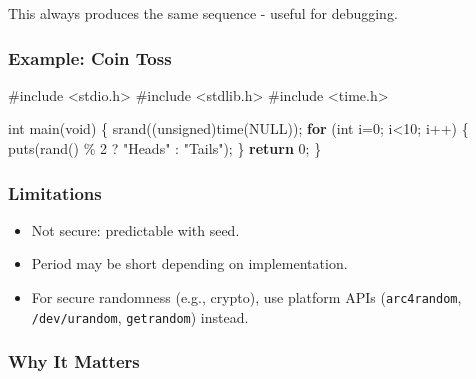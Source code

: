 \documentclass[
  letterpaper,
  DIV=11,
  numbers=noendperiod]{scrreprt}
\newenvironment{Shaded}{\begin{snugshade}}{\end{snugshade}}
\newcommand{\ControlFlowTok}[1]{\textcolor[rgb]{0.00,0.23,0.31}{\textbf{#1}}}
\newcommand{\DataTypeTok}[1]{\textcolor[rgb]{0.68,0.00,0.00}{#1}}
\newcommand{\DecValTok}[1]{\textcolor[rgb]{0.68,0.00,0.00}{#1}}
\newcommand{\ImportTok}[1]{\textcolor[rgb]{0.00,0.46,0.62}{#1}}
\newcommand{\NormalTok}[1]{\textcolor[rgb]{0.00,0.23,0.31}{#1}}
\newcommand{\OperatorTok}[1]{\textcolor[rgb]{0.37,0.37,0.37}{#1}}
\newcommand{\PreprocessorTok}[1]{\textcolor[rgb]{0.68,0.00,0.00}{#1}}
\newcommand{\StringTok}[1]{\textcolor[rgb]{0.13,0.47,0.30}{#1}}
\providecommand{\tightlist}{%
  \setlength{\itemsep}{0pt}\setlength{\parskip}{0pt}}
\begin{document}
This always produces the same sequence - useful for debugging.

\subsubsection{Example: Coin Toss}\label{example-coin-toss}

\begin{Shaded}
\begin{Highlighting}[]
\PreprocessorTok{\#include }\ImportTok{\textless{}stdio.h\textgreater{}}
\PreprocessorTok{\#include }\ImportTok{\textless{}stdlib.h\textgreater{}}
\PreprocessorTok{\#include }\ImportTok{\textless{}time.h\textgreater{}}

\DataTypeTok{int}\NormalTok{ main}\OperatorTok{(}\DataTypeTok{void}\OperatorTok{)} \OperatorTok{\{}
\NormalTok{    srand}\OperatorTok{((}\DataTypeTok{unsigned}\OperatorTok{)}\NormalTok{time}\OperatorTok{(}\NormalTok{NULL}\OperatorTok{));}
    \ControlFlowTok{for} \OperatorTok{(}\DataTypeTok{int}\NormalTok{ i}\OperatorTok{=}\DecValTok{0}\OperatorTok{;}\NormalTok{ i}\OperatorTok{\textless{}}\DecValTok{10}\OperatorTok{;}\NormalTok{ i}\OperatorTok{++)} \OperatorTok{\{}
\NormalTok{        puts}\OperatorTok{(}\NormalTok{rand}\OperatorTok{()} \OperatorTok{\%} \DecValTok{2} \OperatorTok{?} \StringTok{"Heads"} \OperatorTok{:} \StringTok{"Tails"}\OperatorTok{);}
    \OperatorTok{\}}
    \ControlFlowTok{return} \DecValTok{0}\OperatorTok{;}
\OperatorTok{\}}
\end{Highlighting}
\end{Shaded}

\subsubsection{Limitations}\label{limitations}

\begin{itemize}
\tightlist
\item
  Not secure: predictable with seed.
\item
  Period may be short depending on implementation.
\item
  For secure randomness (e.g., crypto), use platform APIs
  (\texttt{arc4random}, \texttt{/dev/urandom}, \texttt{getrandom})
  instead.
\end{itemize}

\subsubsection{Why It Matters}\label{why-it-matters-53}
\end{document}
